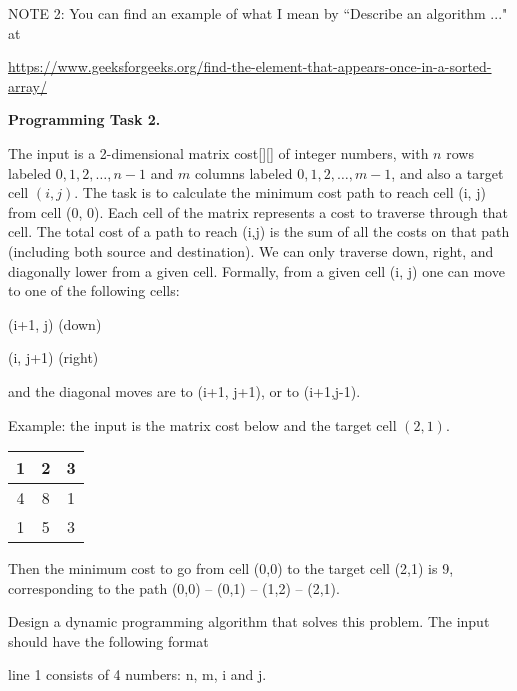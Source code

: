 \documentclass[11pt]{article}
\begin{document}
 
  
\bigskip


NOTE 2:  You can find an example of what I mean by  ``Describe an algorithm ..." at

\url{https://www.geeksforgeeks.org/find-the-element-that-appears-once-in-a-sorted-array/}


\newpage

\textbf{Programming Task 2.}


The input is a 2-dimensional  matrix cost[][] of integer numbers, with $n$ rows labeled $0,1, 2, \ldots, n-1$ and $m$ columns labeled $0,1,2,\ldots, m-1$, and also a target cell $(i,j)$. The task is to calculate the minimum cost path to reach cell (i, j) from cell (0, 0). Each cell of the matrix represents a cost to traverse through that cell. The total cost of a path to reach (i,j) is the sum of all the costs on that path (including both source and destination).
We can only traverse down, right,  and diagonally lower  from a given cell. Formally, from a given cell (i, j) one can move to one of the following cells: 

(i+1, j) (down)


(i, j+1) (right)



 and the diagonal moves are to (i+1, j+1), or to  (i+1,j-1).

\medskip

Example:  the input is the matrix cost below and the target cell $(2,1)$.
\medskip


\begin{tabular}{|c|c|c|}
\hline
1  & 2 & 3 \\
\hline
4 & 8 & 1 \\
\hline
1 & 5 & 3 \\
\hline

\end{tabular}
\medskip

Then the minimum cost to go from cell (0,0) to the target cell (2,1) is 9, corresponding to the path (0,0) -- (0,1) -- (1,2) -- (2,1).


Design a dynamic programming algorithm that solves this problem. The input should have the following format

line 1 consists of 4 numbers: n, m, i and j.
\end{document}
